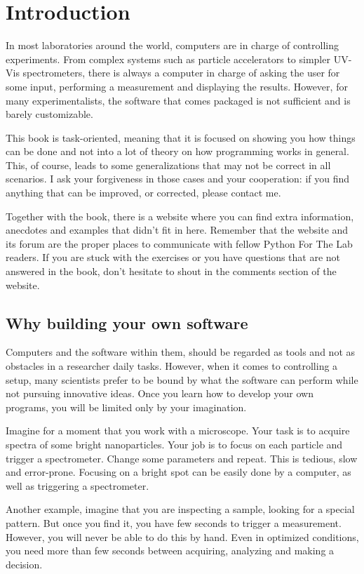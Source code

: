 \chapter{Introduction}
In most laboratories around the world, computers are in charge of controlling experiments. From complex systems such as particle accelerators to simpler UV-Vis spectrometers, there is always a computer in charge of asking the user for some input, performing a measurement and displaying the results. However, for many experimentalists, the software that comes packaged is not sufficient and is barely customizable. 

This book is task-oriented, meaning that it is focused on showing you how things can be done and not into a lot of theory on how programming works in general. This, of course, leads to some generalizations that may not be correct in all scenarios. I ask your forgiveness in those cases and your cooperation: if you find anything that can be improved, or corrected, please contact me.

Together with the book, there is a website where you can find extra information, anecdotes and examples that didn’t fit in here. Remember that the website and its forum are the proper places to communicate with fellow Python For The Lab readers. If you are stuck with the exercises or you have questions that are not answered in the book, don’t hesitate to shout in the comments section of the website.

\section{Why building your own software}
Computers and the software within them, should be regarded as tools and not as obstacles in a researcher daily tasks. However, when it comes to controlling a setup, many scientists prefer to be bound by what the software can perform while not pursuing innovative ideas. Once you learn how to develop your own programs, you will be limited only by your imagination. 

Imagine for a moment that you work with a microscope. Your task is to acquire spectra of some bright nanoparticles. Your job is to focus on each particle and trigger a spectrometer. Change some parameters and repeat. This is tedious, slow and error-prone. Focusing on a bright spot can be easily done by a computer, as well as triggering a spectrometer. 

Another example, imagine that you are inspecting a sample, looking for a special pattern. But once you find it, you have few seconds to trigger a measurement. However, you will never be able to do this by hand. Even in optimized conditions, you need more than few seconds between acquiring, analyzing and making a decision. 

